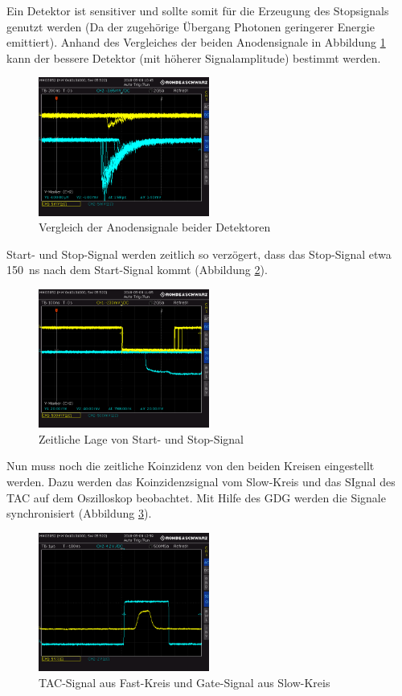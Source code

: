 Ein Detektor ist sensitiver und sollte somit für die Erzeugung des Stopsignals genutzt werden (Da der zugehörige Übergang Photonen geringerer Energie emittiert). Anhand des Vergleiches der beiden Anodensignale in Abbildung \ref{fig:detektorvergleich} kann der bessere Detektor (mit höherer Signalamplitude) bestimmt werden.
\begin{figure}[h]
  \centering
  \includegraphics[width=0.5\textwidth]{data/oszi/detektorvergleich.PNG}
  \caption{Vergleich der Anodensignale beider Detektoren}
  \label{fig:detektorvergleich}
\end{figure}

Start- und Stop-Signal werden zeitlich so verzögert, dass das Stop-Signal etwa \SI{150}{\nano\second} nach dem Start-Signal kommt (Abbildung \ref{fig:zeitabstand_fast}). 
\newpage
\begin{figure}[h]
  \centering
  \includegraphics[width=0.5\textwidth]{data/oszi/zeitabstand_fast.PNG}
  \caption{Zeitliche Lage von Start- und Stop-Signal}
  \label{fig:zeitabstand_fast}
\end{figure}

Nun muss noch die zeitliche Koinzidenz von den beiden Kreisen eingestellt werden. Dazu werden das Koinzidenzsignal vom Slow-Kreis und das SIgnal des TAC auf dem Oszilloskop beobachtet. Mit Hilfe des GDG werden die Signale synchronisiert (Abbildung \ref{fig:fast_und_slow}).
\begin{figure}[h]
  \centering
  \includegraphics[width=0.5\textwidth]{data/oszi/fast_und_slow.PNG}
  \caption{TAC-Signal aus Fast-Kreis und Gate-Signal aus Slow-Kreis}
  \label{fig:fast_und_slow}
\end{figure}

